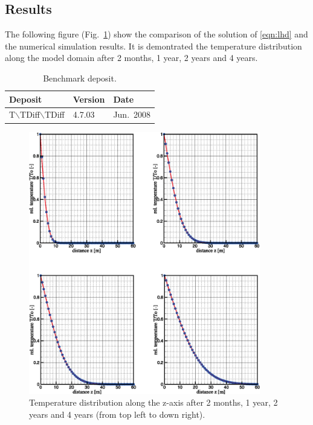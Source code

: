 \subsection{Results}

The following figure (Fig.~\ref{fig-lhd-all}) show the comparison of the solution of \eqref{eqn:lhd} and the numerical simulation results. It is demontrated the temperature distribution along the model domain after 2 months, 1 year, 2 years and 4 years.
\begin{table}%
\caption{Benchmark deposit.}
\begin{center}
\begin{tabular}{lll}
\toprule
Deposit & Version & Date \\
\midrule
T$\backslash$TDiff$\backslash$TDiff & 4.7.03 & Jun.~2008 \\
\bottomrule
\end{tabular}
\end{center}
\end{table}
\begin{figure}%
\centering
\includegraphics[width=0.9\textwidth]{T/figures/lhd-all.eps}
\caption{\label{fig-lhd-all}Temperature distribution along the z-axis after 2 months, 1 year, 2 years and 4 years (from top left to down right).}
\end{figure}
